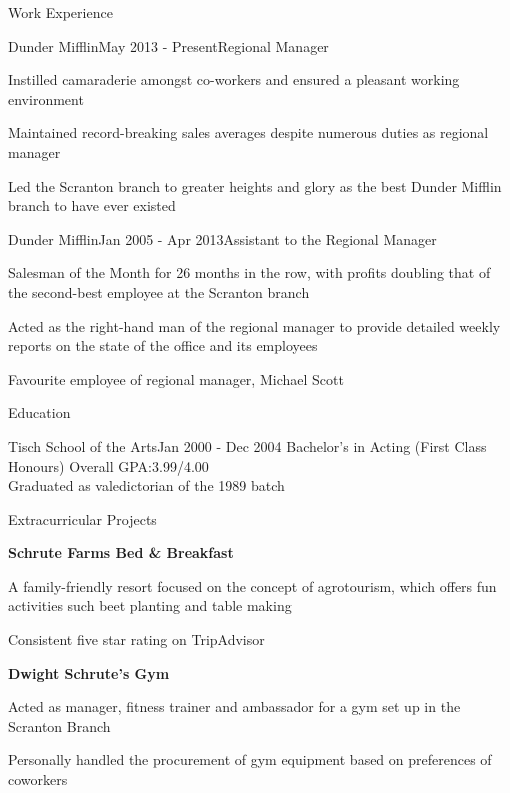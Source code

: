 \documentclass{resume}
\begin{document}
\begin{rSection}{Work Experience}

\begin{rSubsection}{Dunder Mifflin}{May 2013 - Present}{Regional Manager}{}
\item Instilled camaraderie amongst co-workers and ensured a pleasant working environment
\item Maintained record-breaking sales averages despite numerous duties as regional manager
\item Led the Scranton branch to greater heights and glory as the best Dunder Mifflin branch to have ever existed
\end{rSubsection}


\begin{rSubsection}{Dunder Mifflin}{Jan 2005 - Apr 2013}{Assistant to the Regional Manager}{}
\item Salesman of the Month for 26 months in the row, with profits doubling that of the second-best employee at the Scranton branch
\item Acted as the right-hand man of the regional manager to provide detailed weekly reports on the state of the office and its employees
\item Favourite employee of regional manager, Michael Scott
\end{rSubsection}

\end{rSection}

\begin{rSection}{Education}
\begin{rSubsection}
{\bfTisch Tisch School of the Arts}{Jan 2000 - Dec 2004} {Bachelor's in Acting (First Class Honours)} \hfill { Overall GPA:3.99/4.00}
\\ Graduated as valedictorian of the 1989 batch 
\end{rSubsection}

\end{rSection}


\begin{rSection}{Extracurricular Projects}
\begin{rSubsection}
{\bf Schrute Farms Bed \& Breakfast}{} {} {}
\item A family-friendly resort focused on the concept of agrotourism, which offers fun activities such beet planting and table making
\item Consistent five star rating on TripAdvisor
\end{rSubsection}
\begin{rSubsection}
{\bf Dwight Schrute's Gym}{} {} {}
\item Acted as manager, fitness trainer and ambassador for a gym set up in the Scranton Branch
\item Personally handled the procurement of gym equipment based on preferences of coworkers
\end{rSubsection}

\end{rSection}
\end{document}
